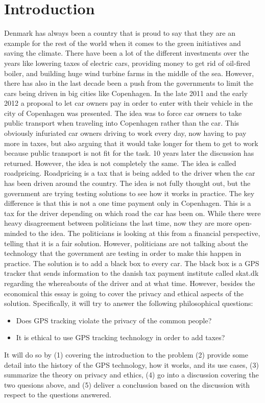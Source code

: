\section{Introduction}
Denmark has always been a country that is proud to say that they are an example for the rest of the world when it comes to the green initiatives and saving the climate. There have been a lot of the different investments over the years like lowering taxes of electric cars, providing money to get rid of oil-fired boiler, and building huge wind turbine farms in the middle of the sea. However, there has also in the last decade been a push from the governments to limit the cars being driven in big cities like Copenhagen. In the late 2011 and the early 2012 a proposal to let car owners pay in order to enter with their vehicle in the city of Copenhagen was presented. The idea was to  force car owners to take public transport when traveling into Copenhagen rather than the car. This obviously infuriated car owners driving to work every day, now having to pay more in taxes, but also arguing that it would take longer for them to get to work because public transport is not fit for the task. 10 years later the discussion has returned. However, the idea is not completely the same. The idea is called roadpricing. Roadpricing is a tax that is being added to the driver when the car has been driven around the country. The idea is not fully thought out, but the government are trying testing solutions to see how it works in practice. The key difference is that this is not a one time payment only in Copenhagen. This is a tax for the driver depending on which road the car has been on. While there were heavy disagreement between politicians the last time, now they are more open-minded to the idea. The politicians is looking at this from a financial perspective, telling that it is a fair solution. However, politicians are not talking about the technology that the government are testing in order to make this happen in practice. The solution is to add a black box to every car. The black box is a GPS tracker that sends information to the danish tax payment institute called skat.dk regarding the whereabouts of the driver and at what time. 
However, besides the economical this essay is going to cover the privacy and ethical aspects of the solution. Specifically, it will try to answer the following philosophical questions:
\begin{itemize}
    \item Does GPS tracking violate the privacy of the common people?
    \item It is ethical to use GPS tracking technology in order to add taxes?
\end{itemize}
It will do so by (1) covering the introduction to the problem (2) provide some detail into the history of the GPS technology, how it works, and its use cases, (3) summarize the theory on privacy and ethics, (4) go into a discussion covering the two quesions above, and (5) deliver a conclussion based on the discussion with respect to the questions answered.
